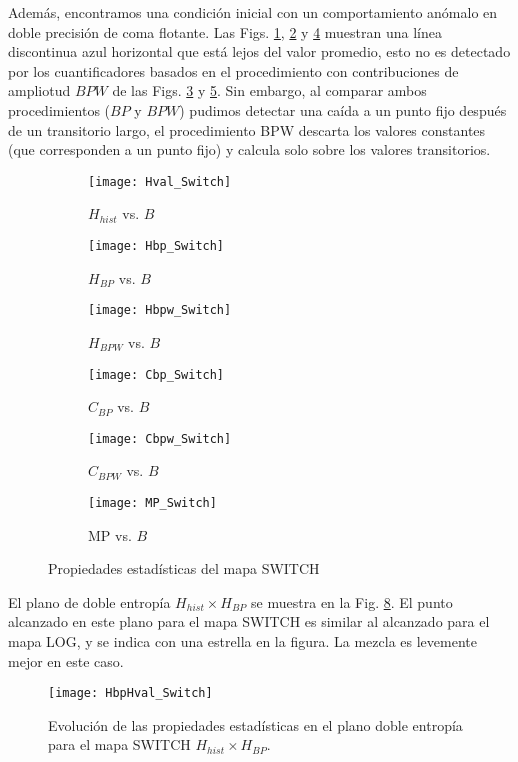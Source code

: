 Además, encontramos una condición inicial con un comportamiento anómalo en doble precisión de coma flotante.
Las Figs. \ref{fig:Hval_Switch}, \ref{fig:Hbp_Switch} y \ref{fig:Cbp_Switch} muestran una línea discontinua azul horizontal que está lejos del valor promedio, esto no es detectado por los cuantificadores basados en el procedimiento con contribuciones de ampliotud $BPW$ de las Figs. \ref{fig:Hbpw_Switch} y \ref{fig:Cbpw_Switch}.
Sin embargo, al comparar ambos procedimientos ($BP$ y $BPW$) pudimos detectar una caída a un punto fijo después de un transitorio largo, el procedimiento BPW descarta los valores constantes (que corresponden a un punto fijo) y calcula solo sobre los valores transitorios.
%
\begin{figure}[htpb]
	\centering
	\begin{subfigure}[b]{0.49\textwidth}
		\texttt{[image: Hval\_Switch]}
		\caption{$H_{hist}$ vs. $B$}
		\label{fig:Hval_Switch}
	\end{subfigure}
	\begin{subfigure}[b]{0.49\textwidth}
		\texttt{[image: Hbp\_Switch]}
		\caption{$H_{BP}$ vs. $B$}
		\label{fig:Hbp_Switch}
	\end{subfigure}
	\begin{subfigure}[b]{0.49\textwidth}
		\texttt{[image: Hbpw\_Switch]}
		\caption{$H_{BPW}$ vs. $B$}
		\label{fig:Hbpw_Switch}
	\end{subfigure}
	\begin{subfigure}[b]{0.49\textwidth}
		\texttt{[image: Cbp\_Switch]}
		\caption{$C_{BP}$ vs. $B$}
		\label{fig:Cbp_Switch}
	\end{subfigure}
	\begin{subfigure}[b]{0.49\textwidth}
		\texttt{[image: Cbpw\_Switch]}
		\caption{$C_{BPW}$ vs. $B$}
		\label{fig:Cbpw_Switch}
	\end{subfigure}
	\begin{subfigure}[b]{0.49\textwidth}
		\texttt{[image: MP\_Switch]}
		\caption{MP vs. $B$}
		\label{fig:MP_Switch}
	\end{subfigure}
	\caption{Propiedades estadísticas del mapa SWITCH}
	\label{fig:SWITCH_QuantiB}
\end{figure}

El plano de doble entropía $H_{hist} \times H_{BP}$ se muestra en la Fig. \ref{fig:SWITCH_HH}.
El punto alcanzado en este plano para el mapa SWITCH es similar al alcanzado para el mapa LOG, y se indica con una estrella en la figura.
La mezcla es levemente mejor en este caso.
%
\begin{figure}[htpb]
	\centering
	\texttt{[image: HbpHval\_Switch]}
	\caption{Evolución de las propiedades estadísticas en el plano doble entropía para el mapa SWITCH $H_{hist} \times H_{BP}$.}
	\label{fig:SWITCH_HH}
\end{figure}

